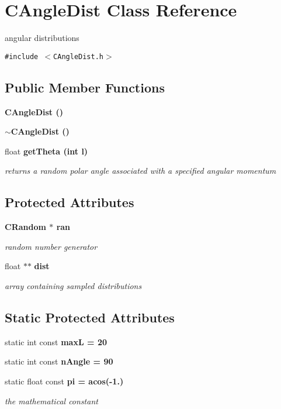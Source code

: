 \section{CAngle\-Dist Class Reference}
\label{classCAngleDist}
angular distributions  


{\tt \#include $<$CAngle\-Dist.h$>$}

\subsection*{Public Member Functions}
\begin{CompactItemize}
\item 
\bf{CAngle\-Dist} ()
\item 
\bf{$\sim$CAngle\-Dist} ()
\item 
float \bf{get\-Theta} (int l)
\begin{CompactList}\small\item\em returns a random polar angle associated with a specified angular momentum \item\end{CompactList}\end{CompactItemize}
\subsection*{Protected Attributes}
\begin{CompactItemize}
\item 
\bf{CRandom} $\ast$ \bf{ran}\label{classCAngleDist_e02977eb97a904d56ca3b3845332300c}

\begin{CompactList}\small\item\em random number generator \item\end{CompactList}\item 
float $\ast$$\ast$ \bf{dist}\label{classCAngleDist_c77de26b9bad4663b58b4f8d1078c710}

\begin{CompactList}\small\item\em array containing sampled distributions \item\end{CompactList}\end{CompactItemize}
\subsection*{Static Protected Attributes}
\begin{CompactItemize}
\item 
static int const \bf{max\-L} = 20
\item 
static int const \bf{n\-Angle} = 90
\item 
static float const \bf{pi} = acos(-1.)\label{classCAngleDist_37d74e9f70a3d094648c40d0da92b947}

\begin{CompactList}\small\item\em the mathematical constant \item\end{CompactList}\end{CompactItemize}


